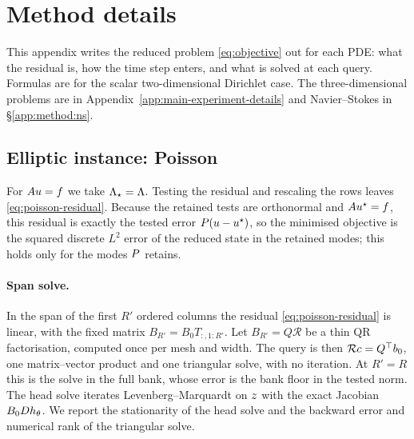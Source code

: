 
\section{Method details}
\label{app:method}
This appendix writes the reduced problem \eqref{eq:objective} out for
each PDE: what the residual is, how the time step enters, and what is
solved at each query. Formulas are for the scalar two-dimensional
Dirichlet case. The three-dimensional problems are in
Appendix~\ref{app:main-experiment-details} and Navier--Stokes in
\S\ref{app:method:ns}.

\subsection{Elliptic instance: Poisson}
\label{app:method:poisson}

For $A u=f$ we take $\Lambda_\star=\Lambda$. Testing the residual
and rescaling the rows leaves \eqref{eq:poisson-residual}.
Because the retained tests are orthonormal and $A u^{\star}=f$, this residual
is exactly the tested error $P(u-u^{\star})$, so the minimised
objective is the squared discrete $L^2$ error of the reduced state in the
retained modes; this holds only for the modes $P$ retains.

\paragraph{Span solve.} In the span of the first $R'$ ordered columns the
residual \eqref{eq:poisson-residual} is linear, with the fixed matrix
$B_{R'}=B_0T_{:,1:R'}$. Let $B_{R'}=Q\mathcal R$ be a thin QR
factorisation, computed once per mesh and width. The query is then
$\mathcal R c=Q^{\top} b_0$, one matrix--vector product and one triangular
solve, with no iteration. At $R'=R$ this is the solve in the full bank,
whose error is the bank floor in the tested norm. The head solve
iterates Levenberg--Marquardt on $z$ with the exact Jacobian
$B_0Dh_\theta$. We report the stationarity of the head solve and the
backward error and numerical rank of the triangular solve.

